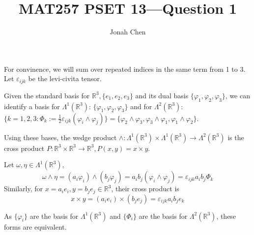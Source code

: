 \documentclass{exam}
\title{MAT257 PSET 13---Question 1}
\author{Jonah Chen}
\date{}
\numberwithin{equation}{section}
\newcommand{\R}{\mathbb{R}}
\begin{document}
    \sffamily
    \maketitle
    For convinence, we will sum over repeated indices in the same term from 1 to 3. Let \(\varepsilon_{ijk}\) be the levi-civita tensor.

    Given the standard basis for \(\R^3, \{e_1,e_2,e_3\}\) and its dual basis \(\{\varphi_1,\varphi_2,\varphi_3\}\), we can identify a basis for \(\Lambda^1(\R^3)\): \(\{\varphi_1,\varphi_2,\varphi_3\}\) and for \(\Lambda^2(\R^3)\): \(\{k=1,2,3:\Phi_k:=\frac{1}{2}\varepsilon_{ijk}(\varphi_i\wedge\varphi_j)\}=\{\varphi_2\wedge\varphi_3,\varphi_3\wedge\varphi_1,\varphi_1\wedge\varphi_2\}\).

    Using these bases, the wedge product \(\wedge:\Lambda^1(\R^3)\times\Lambda^1(\R^3)\to\Lambda^2(\R^3)\) is the cross product \(P:\R^3\times\R^3\to\R^3, P(x,y)=x\times y\).

    Let \(\omega,\eta\in\Lambda^1(\R^3)\),
    \[
        \omega\wedge\eta = (a_i\varphi_i)\wedge(b_j\varphi_j) = a_ib_j(\varphi_i\wedge\varphi_j) = \varepsilon_{ijk}a_ib_j\Phi_k
    \]
    Similarly, for \(x=a_ie_i,y=b_je_j\in\R^3\), their cross product is 
    \[
        x\times y=(a_ie_i)\times (b_je_j) = \varepsilon_{ijk}a_ib_je_k
    \]

    As \(\{\varphi_i\}\) are the basis for \(\Lambda^1(\R^3)\) and \(\{\Phi_i\}\) are the basis for \(\Lambda^2(\R^3)\), these forms are equivalent.
\end{document}
